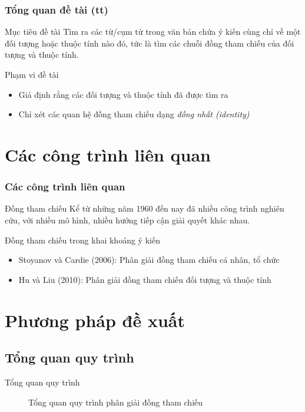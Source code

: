 \documentclass[9pt,xcolor=table]{beamer}
\begin{document}
	\begin{frame}
		\frametitle{Tổng quan đề tài (tt)}
		\begin{block}{Mục tiêu đề tài}
			Tìm ra các từ/cụm từ trong văn bản chứa ý kiến cùng chỉ về một đối tượng hoặc thuộc tính nào đó, tức là tìm các chuỗi đồng tham chiếu của đối tượng và thuộc tính.
		\end{block}		
		\begin{block}{Phạm vi đề tài}
			\begin{itemize}
				\item{Giả định rằng các đối tượng và thuộc tính đã được tìm ra}
				\item{Chỉ xét các quan hệ đồng tham chiếu dạng \textit{đồng nhất (identity)}}
			\end{itemize}
		\end{block}
	\end{frame}


	\section{Các công trình liên quan}
	\begin{frame}
		\frametitle{Các công trình liên quan}
		\begin{block}{Đồng tham chiếu}
			Kể từ những năm 1960 đến nay đã nhiều công trình nghiên cứu, với nhiều mô hình, nhiều hướng tiếp cận giải quyết khác nhau.
		\end{block}
		\begin{block}{Đồng tham chiếu trong khai khoáng ý kiến}
			\begin{itemize}
				\item{Stoyanov và Cardie (2006): Phân giải đồng tham chiếu cá nhân, tổ chức}
				\item{Hu và Liu (2010): Phân giải đồng tham chiếu đối tượng và thuộc tính}
			\end{itemize}
		\end{block}		
	\end{frame}

	\section{Phương pháp đề xuất}
	\subsection{Tổng quan quy trình}
	\begin{frame}{Tổng quan quy trình}		
		\begin{figure}[H]
			\LARGE 
			\centering				
			\resizebox{100mm}{!}{}
			\caption{Tổng quan quy trình phân giải đồng tham chiếu}	
			\label{fig:generalmodel}						
		\end{figure}
	\end{frame}	
\end{document}
